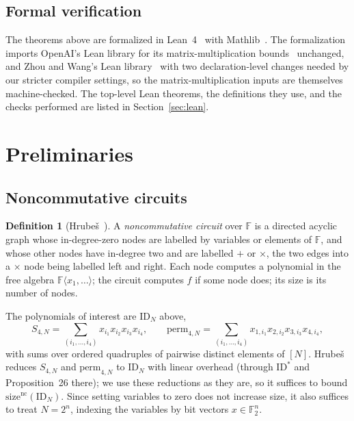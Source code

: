 \documentclass[11pt]{article}
\theoremstyle{definition}
\newtheorem{definition}[theorem]{Definition}
\theoremstyle{remark}
\newcommand{\F}{\mathbb{F}}
\newcommand{\ID}{\mathrm{ID}}
\newcommand{\size}{\mathrm{size}^{\mathrm{nc}}}
\begin{document}
\subsection{Formal verification}
The theorems above are formalized in Lean~4~\cite{Lean4} with Mathlib~\cite{Mathlib2020}. The formalization imports
OpenAI's Lean library for its matrix-multiplication bounds~\cite{OAI2026lean} unchanged, and Zhou and Wang's Lean
library~\cite{ZhouWang2026} with two declaration-level changes needed by our stricter compiler settings, so the
matrix-multiplication inputs are themselves machine-checked. The top-level Lean theorems, the definitions they use, and the
checks performed are listed in Section~\ref{sec:lean}.

\section{Preliminaries}

\subsection{Noncommutative circuits}
\begin{definition}[Hrube\v{s}~\cite{Hrubes2026}]\label{def:circuit}
A \emph{noncommutative circuit} over $\F$ is a directed acyclic graph whose in-degree-zero nodes are labelled by
variables or elements of $\F$, and whose other nodes have in-degree two and are labelled $+$ or $\times$, the two
edges into a $\times$ node being labelled left and right. Each node computes a polynomial in the free algebra
$\F\langle x_1,\dots\rangle$; the circuit computes $f$ if some node does; its size is its number of nodes.
\end{definition}

The polynomials of interest are $\ID_N$ above,
\[
S_{4,N}=\sum_{(i_1,\dots,i_4)}x_{i_1}x_{i_2}x_{i_3}x_{i_4},\qquad
\mathrm{perm}_{4,N}=\sum_{(i_1,\dots,i_4)}x_{1,i_1}x_{2,i_2}x_{3,i_3}x_{4,i_4},
\]
with sums over ordered quadruples of pairwise distinct elements of $[N]$. Hrube\v{s}~\cite[Cor.~27]{Hrubes2026}
reduces $S_{4,N}$ and $\mathrm{perm}_{4,N}$ to $\ID_N$ with linear overhead (through $\ID^\ast$ and
Proposition~26 there); we use these reductions as they are, so it suffices to bound $\size(\ID_N)$. Since setting
variables to zero does not increase size, it also suffices to treat $N=2^n$, indexing the variables by bit vectors
$x\in\F_2^n$.
\end{document}
